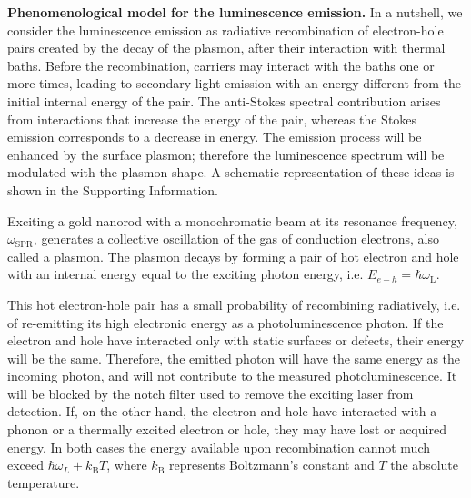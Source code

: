 \documentclass[journal=nalefd,manuscript=letter]{achemso}
\newcommand{\HI}[1]{{#1}} %
\newcommand{\fs}{\ensuremath{\,\textrm{fs}}}
\newcommand{\ps}{\ensuremath{\,\textrm{ps}}}
\begin{document}
\HI{\textbf{Phenomenological model for the luminescence emission.} 
In a nutshell, we consider the luminescence emission as radiative recombination of
electron-hole pairs created by the decay of the plasmon, after their interaction
with thermal baths. Before the recombination, carriers may interact with the baths one or more
times, leading to secondary light emission with an energy different from the initial internal energy of the pair. 
The anti-Stokes spectral contribution arises from interactions that increase the energy 
of the pair, whereas the Stokes emission corresponds to a decrease in energy. The emission process will be 
enhanced by the surface plasmon; therefore the luminescence spectrum will be modulated with the plasmon shape. 
A schematic representation of these ideas is shown in the Supporting Information.}

\HI{Exciting a gold nanorod with a monochromatic beam at its resonance frequency, $\omega_\textrm{SPR}$, generates a collective oscillation of the gas of conduction electrons, also called a plasmon.} 
The plasmon decays by forming a pair of hot electron and hole with an internal energy equal to the exciting
photon energy\cite{Sundararaman2014,Brongersma2015,AlejandroManjavacasJunG.LiuVikramKulkarni2014}, 
i.e. \HI{ $E_{e-h}=\hbar \omega_\textrm{L}$.}

This hot electron-hole pair has a small probability of recombining radiatively, i.e. of 
re-emitting its high electronic energy as a photoluminescence photon. If the electron and hole
have interacted only with static surfaces or defects, their energy will be the same.
Therefore, the emitted photon will have the same energy as the incoming
photon, and will not contribute to the measured photoluminescence. It will be
blocked by the notch filter used to remove the exciting laser from detection.
If, on the other hand, the electron and hole have interacted with a
phonon or a thermally excited electron or hole, they may have lost or acquired
energy.
In both cases the energy available upon
recombination cannot much exceed $\hbar\omega_L+k_\textrm{B}T$, \HI{where $k_\textrm{B}$ 
represents Boltzmann's constant and $T$ the absolute temperature.} 
\end{document}
